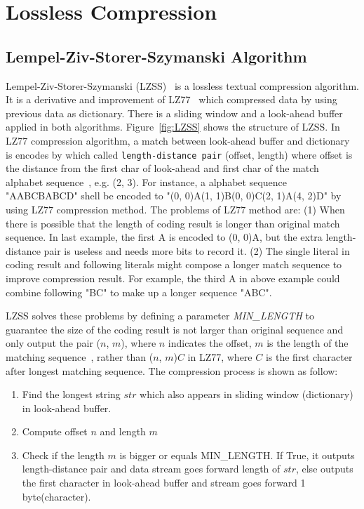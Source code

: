 \section{Lossless Compression}

\subsection{Lempel-Ziv-Storer-Szymanski Algorithm}
Lempel-Ziv-Storer-Szymanski (LZSS)~\cite{storer1982data} is a lossless textual compression algorithm. 
It is a derivative and improvement of LZ77~\cite{ziv1977universal} which 
compressed data by using previous data as dictionary. There is a sliding window and
a look-ahead buffer applied in both algorithms. Figure~\ref{fig:LZSS} shows the
structure of LZSS. In LZ77 compression algorithm, a match between look-ahead buffer and dictionary is encodes by
which called \texttt{length-distance pair} (offset, length) where offset is the distance from the first char of look-ahead and first char of the match alphabet sequence~\cite{ziv1977universal}, e.g. (2, 3).
For instance, a alphabet sequence "AABCBABCD" shell be encoded to "(0, 0)A(1, 1)B(0, 0)C(2, 1)A(4, 2)D"  by using LZ77 compression method.
The problems of LZ77 method are: (1) When there is possible that the length of coding result is longer than original match sequence. In last example, the first A is encoded to (0, 0)A, but the extra length-distance pair is useless and needs more bits to record it. (2) The single literal in coding result and following literals might compose a longer match sequence to improve compression result. For example, the third A in above example could combine following "BC" to make up a longer sequence "ABC". 

LZSS solves these problems by defining a parameter \emph{MIN\_LENGTH} to guarantee the size of the coding result is not larger than original sequence and only output the pair ($n$, $m$), where $n$ indicates the offset, $m$ is the length of the matching sequence~\cite{storer1982data}, rather than ($n$, $m$)$C$ in LZ77, where $C$ is
the first character after longest matching sequence. The compression process is shown as follow:

\begin{enumerate}
    \item Find the longest string $str$ which also appears in sliding
    window (dictionary) in look-ahead buffer.
    \item Compute offset $n$ and length $m$
    \item Check if the length $m$ is bigger or equals MIN\_LENGTH. If True,
    it outputs length-distance pair and data stream goes forward length of $str$, else
    outputs the first character in look-ahead buffer and stream goes forward 1
    byte(character).
\end{enumerate}

